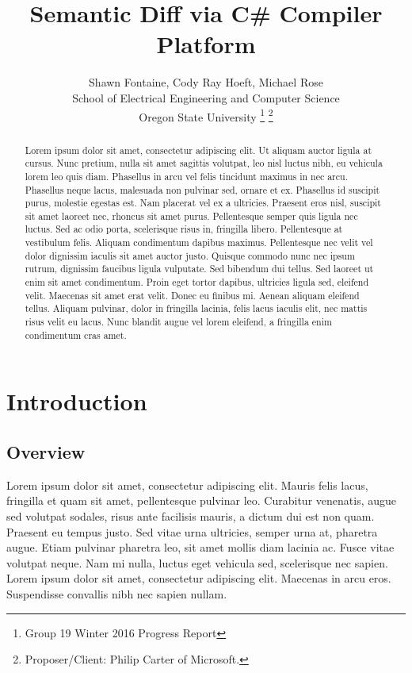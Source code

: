 \documentclass[draftclsnofoot,onecolumn]{IEEEtran}
\begin{document}
\lstset{style=cSharp}
\title{Semantic Diff via C\# Compiler Platform}

\author{Shawn Fontaine, Cody Ray Hoeft, Michael Rose\\
	School of Electrical Engineering and Computer Science\\
	Oregon State University
\thanks{Group 19 Winter 2016 Progress Report}
\thanks{Proposer/Client: Philip Carter of Microsoft.}}

\maketitle
\thispagestyle{empty} %

\begin{abstract}
Lorem ipsum dolor sit amet, consectetur adipiscing elit. Ut aliquam auctor ligula at cursus. Nunc pretium, nulla sit amet sagittis volutpat, leo nisl luctus nibh, eu vehicula lorem leo quis diam. Phasellus in arcu vel felis tincidunt maximus in nec arcu. Phasellus neque lacus, malesuada non pulvinar sed, ornare et ex. Phasellus id suscipit purus, molestie egestas est. Nam placerat vel ex a ultricies. Praesent eros nisl, suscipit sit amet laoreet nec, rhoncus sit amet purus. Pellentesque semper quis ligula nec luctus. Sed ac odio porta, scelerisque risus in, fringilla libero. Pellentesque at vestibulum felis. Aliquam condimentum dapibus maximus. Pellentesque nec velit vel dolor dignissim iaculis sit amet auctor justo. Quisque commodo nunc nec ipsum rutrum, dignissim faucibus ligula vulputate. Sed bibendum dui tellus. Sed laoreet ut enim sit amet condimentum. Proin eget tortor dapibus, ultricies ligula sed, eleifend velit. Maecenas sit amet erat velit. Donec eu finibus mi. Aenean aliquam eleifend tellus. Aliquam pulvinar, dolor in fringilla lacinia, felis lacus iaculis elit, nec mattis risus velit eu lacus. Nunc blandit augue vel lorem eleifend, a fringilla enim condimentum cras amet.
\end{abstract}

\newpage
\setcounter{tocdepth}{2}
\tableofcontents
\newpage

\section{Introduction}
\subsection{Overview}
Lorem ipsum dolor sit amet, consectetur adipiscing elit. Mauris felis lacus, fringilla et quam sit amet, pellentesque pulvinar leo. Curabitur venenatis, augue sed volutpat sodales, risus ante facilisis mauris, a dictum dui est non quam. Praesent eu tempus justo. Sed vitae urna ultricies, semper urna at, pharetra augue. Etiam pulvinar pharetra leo, sit amet mollis diam lacinia ac. Fusce vitae volutpat neque. Nam mi nulla, luctus eget vehicula sed, scelerisque nec sapien. Lorem ipsum dolor sit amet, consectetur adipiscing elit. Maecenas in arcu eros. Suspendisse convallis nibh nec sapien nullam.
\end{document}
